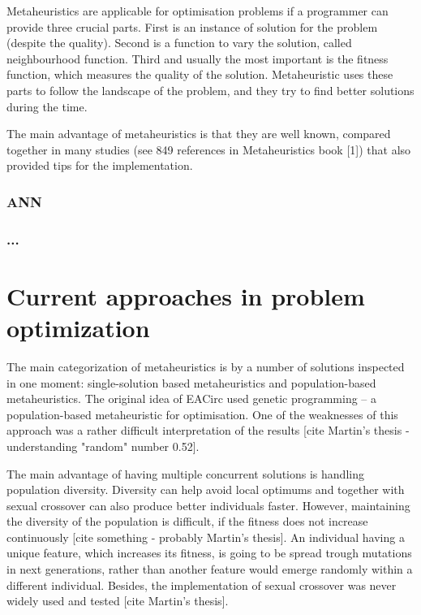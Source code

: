 \documentclass[
  print, %
  Table,   %
  nolof,     %
  nolot,     %
  11pt, %
  oneside  %
]{fithesis3}
\begin{document}
Metaheuristics are applicable for optimisation problems if a programmer can provide three crucial parts. First is an instance of solution for the problem (despite the quality). Second is a function to vary the solution, called neighbourhood function. Third and usually the most important is the fitness function, which measures the quality of the solution. Metaheuristic uses these parts to follow the landscape of the problem, and they try to find better solutions during the time.

The main advantage of metaheuristics is that they are well known, compared together in many studies (see 849 references in Metaheuristics book [1]) that also provided tips for the implementation.

\subsection{ANN}

\subsection{...}

\chapter{Current approaches in problem optimization}

The main categorization of metaheuristics is by a number of solutions inspected in one moment: single-solution based metaheuristics and population-based metaheuristics. The original idea of EACirc used genetic programming -- a population-based metaheuristic for optimisation. One of the weaknesses of this approach was a rather difficult interpretation of the results [cite Martin's thesis - understanding "random" number 0.52].

The main advantage of having multiple concurrent solutions is handling population diversity. Diversity can help avoid local optimums and together with sexual crossover can also produce better individuals faster. However, maintaining the diversity of the population is difficult, if the fitness does not increase continuously [cite something - probably Martin's thesis]. An individual having a unique feature, which increases its fitness, is going to be spread trough mutations in next generations, rather than another feature would emerge randomly within a different individual. Besides, the implementation of sexual crossover was never widely used and tested [cite Martin's thesis].
\end{document}
